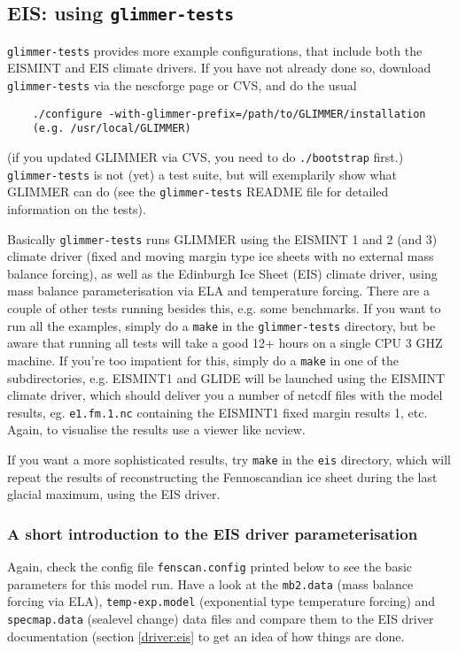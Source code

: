 
\subsection{EIS: using \texttt{glimmer-tests}}
\texttt{glimmer-tests} provides more example configurations, that include both the EISMINT
and EIS climate drivers. If you have not already done so, download
\texttt{glimmer-tests} via the nescforge page or CVS, and do the usual
\begin{verbatim}
    ./configure -with-glimmer-prefix=/path/to/GLIMMER/installation
    (e.g. /usr/local/GLIMMER)
\end{verbatim}
(if you updated GLIMMER via CVS, you need to do \texttt{./bootstrap} first.)\\
\texttt{glimmer-tests} is not (yet) a test suite, but will exemplarily show
what GLIMMER can do (see the \texttt{glimmer-tests} README file for detailed
information on the tests).

Basically \texttt{glimmer-tests} runs GLIMMER using the EISMINT 1 and 2 (and 3)
climate driver (fixed and moving margin type ice sheets with no external mass
balance forcing), as well as the Edinburgh Ice Sheet (EIS) climate driver,
using mass balance parameterisation via ELA and temperature forcing. There are
a couple of other tests running besides this, e.g. some benchmarks. If you want
to run all the examples, simply do a \texttt{make} in the
\texttt{glimmer-tests} directory, but be aware that running all tests will take a good
12+ hours on a single CPU 3 GHZ machine. If you're too impatient for this,
simply do a \texttt{make} in one of the subdirectories, e.g. EISMINT1 and GLIDE
will be launched using the EISMINT climate driver, which should deliver you a
number of netcdf files with the model results, eg. \texttt{e1.fm.1.nc}
containing the EISMINT1 fixed margin results 1, etc. Again, to visualise the
results use a viewer like ncview.

If you want a more sophisticated results, try \texttt{make} in the \texttt{eis}
directory, which will repeat the results of \cite{Hagdorn2003} reconstructing
the Fennoscandian ice sheet during the last glacial maximum, using the EIS
driver.

\subsubsection{A short introduction to the EIS driver parameterisation}

Again, check the config file \texttt{fenscan.config} printed below to see the basic
parameters for this model run. Have a look at the \texttt{mb2.data} (mass
balance forcing via ELA), \texttt{temp-exp.model} (exponential type temperature
forcing) and \texttt{specmap.data} (sealevel change) data files and compare
them to the EIS driver documentation (section \ref{driver:eis} to get an idea of how things are done.

